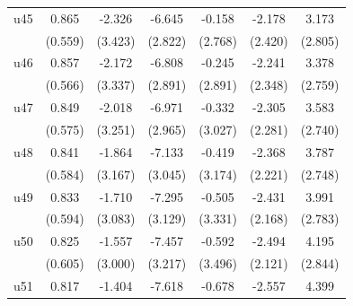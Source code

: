\begin{table}[htbp]
\begin{tabular}{l*{6}{c}}
\addlinespace
u45                 &       0.865         &      -2.326         &      -6.645\sym{**} &      -0.158         &      -2.178         &       3.173         \\
                    &     (0.559)         &     (3.423)         &     (2.822)         &     (2.768)         &     (2.420)         &     (2.805)         \\
\addlinespace
u46                 &       0.857         &      -2.172         &      -6.808\sym{**} &      -0.245         &      -2.241         &       3.378         \\
                    &     (0.566)         &     (3.337)         &     (2.891)         &     (2.891)         &     (2.348)         &     (2.759)         \\
\addlinespace
u47                 &       0.849         &      -2.018         &      -6.971\sym{**} &      -0.332         &      -2.305         &       3.583         \\
                    &     (0.575)         &     (3.251)         &     (2.965)         &     (3.027)         &     (2.281)         &     (2.740)         \\
\addlinespace
u48                 &       0.841         &      -1.864         &      -7.133\sym{**} &      -0.419         &      -2.368         &       3.787         \\
                    &     (0.584)         &     (3.167)         &     (3.045)         &     (3.174)         &     (2.221)         &     (2.748)         \\
\addlinespace
u49                 &       0.833         &      -1.710         &      -7.295\sym{**} &      -0.505         &      -2.431         &       3.991         \\
                    &     (0.594)         &     (3.083)         &     (3.129)         &     (3.331)         &     (2.168)         &     (2.783)         \\
\addlinespace
u50                 &       0.825         &      -1.557         &      -7.457\sym{**} &      -0.592         &      -2.494         &       4.195         \\
                    &     (0.605)         &     (3.000)         &     (3.217)         &     (3.496)         &     (2.121)         &     (2.844)         \\
\addlinespace
u51                 &       0.817         &      -1.404         &      -7.618\sym{**} &      -0.678         &      -2.557         &       4.399         \\

\end{tabular}
\end{table}
